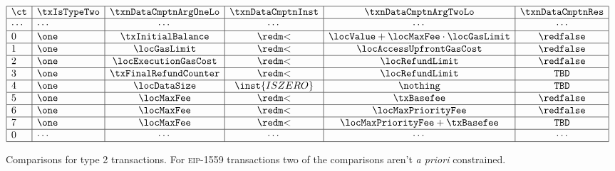\begin{figure}[!h]
	\[                                                                                                                          
	\begin{array}{|l|l|c|c|c|c|c|c|} \hline                                                                                                                      
		\ct    & \txIsTypeTwo & \txnDataCmptnArgOneLo & \txnDataCmptnInst & \txnDataCmptnArgTwoLo                     & \txnDataCmptnRes \\ \hline
		\cdots & \cdots       & \cdots                & \cdots            & \cdots                                    & \cdots           \\ \hline
		0      & \one         & \txInitialBalance     & \locLT            & \locValue + \locMaxFee \cdot \locGasLimit & \rFaux           \\ \hline
		1      & \one         & \locGasLimit          & \locLT            & \locAccessUpfrontGasCost                  & \rFaux           \\ \hline
		2      & \one         & \locExecutionGasCost  & \locLT            & \locRefundLimit                           & \rFaux           \\ \hline
		3      & \one         & \txFinalRefundCounter & \locLT            & \locRefundLimit                           & \texttt{TBD}     \\ \hline
		4      & \one         & \locDataSize          & \inst{ISZERO}     & \nothing                                  & \texttt{TBD}     \\ \hline
		5      & \one         & \locMaxFee            & \locLT            & \txBasefee                                & \rFaux           \\ \hline
		6      & \one         & \locMaxFee            & \locLT            & \locMaxPriorityFee                        & \rFaux           \\ \hline
		7      & \one         & \locMaxFee            & \locLT            & \locMaxPriorityFee + \txBasefee           & \texttt{TBD}     \\ \hline
		0      & \cdots       & \cdots                & \cdots            & \cdots                                    & \cdots           \\ \hline
	\end{array}
	\]
	\caption{%
		Comparisons for type 2 transactions. \saNote{} For \textsc{eip-1559} transactions two of the comparisons aren't \emph{a priori} constrained.}
\end{figure}

